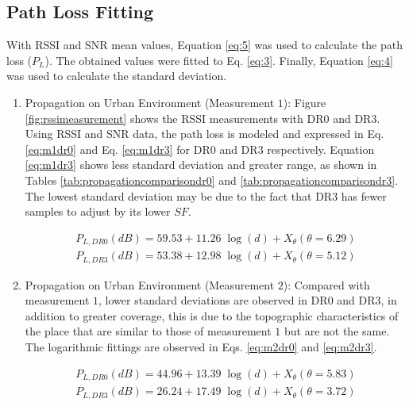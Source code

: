\subsection{Path Loss Fitting}
\label{sub:fitting}

With RSSI and SNR mean values, Equation \eqref{eq:5} was used to calculate the path loss ($P_L$). The obtained values were fitted to Eq. \eqref{eq:3}. Finally, Equation \eqref{eq:4} was used to calculate the standard deviation.

\begin{enumerate}

\item Propagation on Urban Environment (Measurement $1$): Figure \ref{fig:rssimeasurement} shows the RSSI measurements with DR$0$ and DR$3$. Using RSSI and SNR data, the path loss is modeled and expressed in Eq. \eqref{eq:m1dr0} and Eq. \eqref{eq:m1dr3} for DR$0$ and DR$3$ respectively. Equation \eqref{eq:m1dr3} shows less standard deviation and greater range, as shown in Tables \ref{tab:propagationcomparisondr0} and \ref{tab:propagationcomparisondr3}. The lowest standard deviation may be due to the fact that DR$3$ has fewer samples to adjust by its lower $SF$.

\begin{eqnarray} 
P_{L,DR0}(dB) = 59.53+11.26\;\log(d)+X_\theta(\theta=6.29) \label{eq:m1dr0}\\
P_{L,DR3}(dB) = 53.38+12.98\;\log(d)+X_\theta(\theta=5.12) \label{eq:m1dr3}
\end{eqnarray}

\item Propagation on Urban Environment (Measurement $2$): Compared with measurement $1$, lower standard deviations are observed in DR$0$ and DR$3$, in addition to greater coverage, this is due to the topographic characteristics of the place that are similar to those of measurement $1$ but are not the same. The logarithmic fittings are observed in Eqs. \eqref{eq:m2dr0} and \eqref{eq:m2dr3}.

\begin{eqnarray} 
P_{L,DR0}(dB) = 44.96+13.39\;\log(d)+X_\theta(\theta=5.83) \label{eq:m2dr0} \\
P_{L,DR3}(dB) = 26.24+17.49\;\log(d)+X_\theta(\theta=3.72)  \label{eq:m2dr3}
\end{eqnarray}


\end{enumerate}
